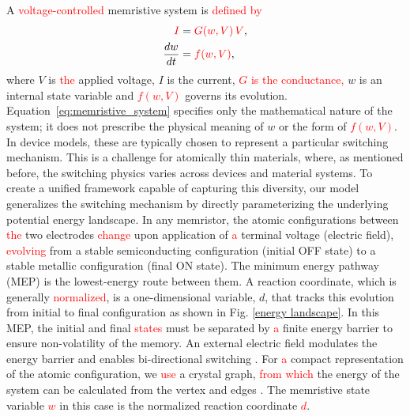 \documentclass[aip,apl,reprint,floatfix]{revtex4-2}
\newcommand{\changed}[1]{\textcolor{red}{#1}}
\begin{document}

A \changed{voltage-controlled} memristive system \cite{Chua1976} is \changed{defined by}
\begin{equation}
\begin{aligned}
    \changed{I} &= \changed{G(w,V)\,V}, \\
    \frac{dw}{dt} &= \changed{f(w,V)},
\end{aligned}
\label{eq:memristive_system}
\end{equation}
where $V$ is \changed{the} applied voltage, $I$ is the current, \changed{$G$ is the conductance,} $w$ is an internal state variable and \changed{$f(w,V)$} governs its evolution. Equation~\eqref{eq:memristive_system} specifies only the mathematical nature of the system; it does not prescribe the physical meaning of $w$ or the form of \changed{$f(w,V)$}. In device models, these are typically chosen to represent a particular switching mechanism. This is a challenge for atomically thin materials, where, as mentioned before, the switching physics varies across devices and material systems. To create a unified framework capable of capturing this diversity, our model generalizes the switching mechanism by directly parameterizing the underlying potential energy landscape. In any memristor, the atomic configurations between \changed{the} two electrodes \changed{change} upon application of \changed{a} terminal voltage (electric field), \changed{evolving} from a stable semiconducting configuration (initial OFF state) to a stable metallic configuration (final ON state). The minimum energy pathway (MEP) is the lowest-energy route between them. A reaction coordinate, which is generally \changed{normalized}, is a one-dimensional variable, $d$, that tracks this evolution from initial to final configuration as shown in Fig. \ref{energy landscape}. In this MEP, the initial and final \changed{states} must be separated by \changed{a} finite energy barrier to ensure non-volatility of the memory. An external electric field modulates the energy barrier and enables bi-directional switching \cite{Ducry2022,Mitra2021,Guha}. For \changed{a} compact representation of the atomic configuration, we \changed{use} a crystal graph, \changed{from which} the energy of the system can be calculated from the vertex and edges \cite{Zhao}. The memristive state variable \changed{$w$} in this case is the normalized reaction coordinate\changed{ $d$}.
\end{document}

